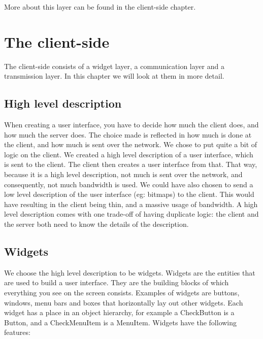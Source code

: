 \documentclass[11pt,a4paper]{article}
\begin{document}
More about this layer can be found in the client-side chapter.

\newpage
\section{The client-side}

The client-side consists of a widget layer, a communication layer and a transmission layer.
In this chapter we will look at them in more detail.

\subsection{High level description}

When creating a user interface, you have to decide how much the client does, and how much the server does.
The choice made is reflected in how much is done at the client, and how much is sent over the network.
We chose to put quite a bit of logic on the client.
We created a high level description of a user interface, which is sent to the client.
The client then creates a user interface from that.
That way, because it is a high level description, not much is sent over the network, and consequently, not much bandwidth is used.
We could have also chosen to send a low level description of the user interface (eg: bitmaps) to the client.
This would have resulting in the client being thin, and a massive usage of bandwidth.
A high level description comes with one trade-off of having duplicate logic: the client and the server both need to know the details of the description.

\subsection{Widgets}

We choose the high level description to be widgets.
Widgets are the entities that are used to build a user interface.
They are the building blocks of which everything you see on the screen consists.
Examples of widgets are buttons, windows, menu bars and boxes that horizontally lay out other widgets.
Each widget has a place in an object hierarchy, for example a CheckButton is a Button, and a CheckMenuItem is a MenuItem.
Widgets have the following features:
\end{document}
